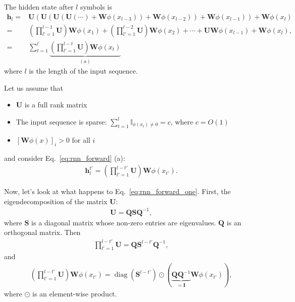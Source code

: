\documentclass{report}
\newcommand{\vect}[1]{\mathbf{#1}}
\newcommand{\matr}[1]{\mathbf{#1}}
\newcommand{\diag}[0]{\operatorname{diag}}
\newcommand{\vh}[0]{\vect{h}}
\newcommand{\mW}[0]{\matr{W}}
\newcommand{\mQ}[0]{\matr{Q}}
\newcommand{\mU}[0]{\matr{U}}
\newcommand{\mS}{\matr{S}}
\newcommand{\mI}{\matr{I}}
\newcommand{\II}[0]{\mathbb{I}}
\begin{document}
The hidden state after $l$ symbols is
\begin{align}
    \vh_l =& \mU(\mU (\mU (\mU (\cdots) + \mW\phi(x_{l-3})) + \mW\phi(x_{l-2})) +
    \mW\phi(x_{l-1})) + \mW\phi(x_l) 
    \nonumber
    \\
    =& \left(\prod_{l'=1}^{l-1} \mU\right) \mW\phi(x_{1})
    + \left(\prod_{l'=1}^{l-2} \mU\right) \mW\phi(x_{2})
    + \cdots 
    + \mU \mW \phi(x_{l-1}) 
    + \mW \phi(x_l), 
    \nonumber
    \\
    \label{eq:rnn_forward}
    =& \sum_{t=1}^l \underbrace{\left( \prod_{l'=1}^{l-t} \mU\right) \mW\phi(x_t)}_{(a)}
\end{align}
where $l$ is the length of the input sequence.

Let us assume that
\begin{itemize}
    \itemsep 0em
    \item $\mU$ is a full rank matrix
    \item The input sequence is sparse: $\sum_{t=1}^l \II_{\phi(x_t) \neq 0} =
        c$, where $c=O(1)$
    \item $\left[ \mW \phi(x) \right]_i > 0$ for all $i$
\end{itemize}
and consider Eq.~\eqref{eq:rnn_forward} (a):
\begin{align}
    \label{eq:rnn_forward_one}
    \vh_l^{t'} = \left( \prod_{l'=1}^{l-t'} \mU\right) 
    \mW\phi(x_{t'}).
\end{align}

Now, let's look at what happens to Eq.~\eqref{eq:rnn_forward_one}. First, the
eigendecomposition of the matrix $\mU$:
\begin{align*}
    \mU = \mQ \mS \mQ^{-1},
\end{align*}
where $\mS$ is a diagonal matrix whose non-zero entries are eigenvalues.
$\mQ$ is an orthogonal matrix. Then
\begin{align*}
    \prod_{l'=1}^{l-t'} \mU = \mQ \mS^{l-t'} \mQ^{-1},
\end{align*}
and
\begin{align*}
    \left(\prod_{l'=1}^{l-t'} \mU\right) \mW\phi(x_{t'})
    = \diag(\mS^{l-t'}) \odot (\underbrace{\mQ \mQ^{-1}}_{=\mI} \mW\phi(x_{t'})),
\end{align*}
where $\odot$ is an element-wise product.
\end{document}
